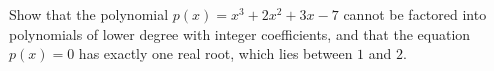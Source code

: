 Show that the polynomial $p(x)=x^3+2x^2+3x-7$ cannot be factored into polynomials of lower degree with integer coefficients, and that the equation $p(x)=0$ has exactly one real root, which lies between $1$ and $2$.
